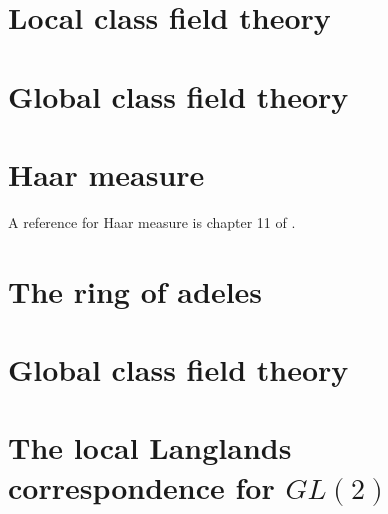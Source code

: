 \documentclass{amsart}
\begin{document}
\section{Local class field theory}

\section{Global class field theory}

\section{Haar measure}

A reference for Haar measure is chapter 11 of \cite{Halmos-measure}.

\section{The ring of adeles}

\section{Global class field theory}

\section{The local Langlands correspondence for $GL(2)$}



\raggedright




\end{document}
